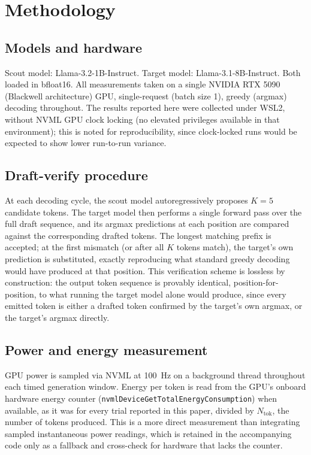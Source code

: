 \documentclass[conference]{IEEEtran}
\begin{document}
\section{Methodology}

\subsection{Models and hardware}

Scout model: Llama-3.2-1B-Instruct. Target model: Llama-3.1-8B-Instruct.
Both loaded in bfloat16. All measurements taken on a single NVIDIA RTX 5090
(Blackwell architecture) GPU, single-request (batch size 1), greedy
(argmax) decoding throughout. The results reported here were collected under
WSL2, without NVML GPU clock locking (no elevated privileges available in
that environment); this is noted for reproducibility, since clock-locked runs
would be expected to show lower run-to-run variance.

\subsection{Draft-verify procedure}

At each decoding cycle, the scout model autoregressively proposes $K{=}5$
candidate tokens. The target model then performs a single forward pass over
the full draft sequence, and its argmax predictions at each position are
compared against the corresponding drafted tokens. The longest matching
prefix is accepted; at the first mismatch (or after all $K$ tokens match),
the target's own prediction is substituted, exactly reproducing what
standard greedy decoding would have produced at that position. This
verification scheme is lossless by construction: the output token sequence
is provably identical, position-for-position, to what running the target
model alone would produce, since every emitted token is either a drafted
token confirmed by the target's own argmax, or the target's argmax directly.

\subsection{Power and energy measurement}

GPU power is sampled via NVML at 100~Hz on a background thread throughout
each timed generation window. Energy per token is read from the GPU's
onboard hardware energy counter
(\texttt{nvmlDeviceGetTotalEnergyConsumption}) when available, as it was for
every trial reported in this paper, divided by $N_{\text{tok}}$, the number
of tokens produced. This is a more direct measurement than integrating
sampled instantaneous power readings, which is retained in the accompanying
code only as a fallback and cross-check for hardware that lacks the counter.
\end{document}
